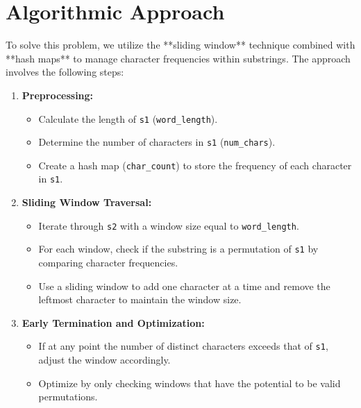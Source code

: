 
\section*{Algorithmic Approach}

To solve this problem, we utilize the **sliding window** technique combined with **hash maps** to manage character frequencies within substrings. The approach involves the following steps:

\begin{enumerate}
    \item \textbf{Preprocessing:}
    \begin{itemize}
        \item Calculate the length of \texttt{s1} (\texttt{word\_length}).
        \item Determine the number of characters in \texttt{s1} (\texttt{num\_chars}).
        \item Create a hash map (\texttt{char\_count}) to store the frequency of each character in \texttt{s1}.
    \end{itemize}
    
    \item \textbf{Sliding Window Traversal:}
    \begin{itemize}
        \item Iterate through \texttt{s2} with a window size equal to \texttt{word\_length}.
        \item For each window, check if the substring is a permutation of \texttt{s1} by comparing character frequencies.
        \item Use a sliding window to add one character at a time and remove the leftmost character to maintain the window size.
    \end{itemize}
    
    \item \textbf{Early Termination and Optimization:}
    \begin{itemize}
        \item If at any point the number of distinct characters exceeds that of \texttt{s1}, adjust the window accordingly.
        \item Optimize by only checking windows that have the potential to be valid permutations.
    \end{itemize}
\end{enumerate}

